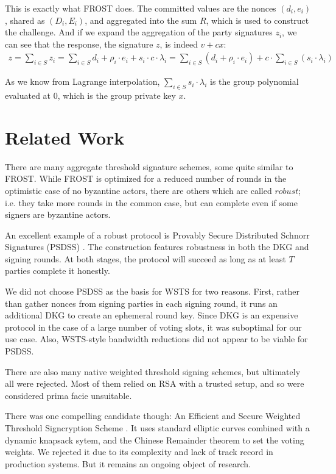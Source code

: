 \documentclass{article}
\theoremstyle{definition}
\theoremstyle{remark}
\begin{document}
This is exactly what FROST does.  The committed values are the nonces $(d_i, e_i)$, shared as $(D_i, E_i)$, and aggregated into the sum $R$, which is used to construct the challenge.  And if we expand the aggregation of the party signatures $z_i$, we can see that the response, the signature $z$, is indeed $v + cx$:
\begin{align}
  z = \sum_{i \in S}^{} z_i = \sum_{i \in S}^{} d_i + \rho_i \cdot e_i + s_i \cdot c \cdot \lambda_i = \sum_{i \in S}^{} (d_i + \rho_i \cdot e_i) + c \cdot \sum_{i \in S}^{}(s_i \cdot \lambda_i)\nonumber
\end{align}

As we know from Lagrange interpolation, $\sum_{i \in S}^{} s_i \cdot \lambda_i$ is the group polynomial evaluated at $0$, which is the group private key $x$.

\newpage
\onecolumn
\section{
  Related Work
}

There are many aggregate threshold signature schemes, some quite similar to FROST.  While FROST is optimized for a reduced number of rounds in the optimistic case of no byzantine actors, there are others which are called $robust$; i.e. they take more rounds in the common case, but can complete even if some signers are byzantine actors.

An excellent example of a robust protocol is Provably Secure Distributed Schnorr Signatures (PSDSS) \cite{psdss}.  The construction features robustness in both the DKG and signing rounds.  At both stages, the protocol will succeed as long as at least $T$ parties complete it honestly.

We did not choose PSDSS as the basis for WSTS for two reasons.  First, rather than gather nonces from signing parties in each signing round, it runs an additional DKG to create an ephemeral round key.  Since DKG is an expensive protocol in the case of a large number of voting slots, it was suboptimal for our use case.  Also, WSTS-style bandwidth reductions did not appear to be viable for PSDSS.

There are also many native weighted threshold signing schemes, but ultimately all were rejected.  Most of them relied on RSA with a trusted setup, and so were considered prima facie unsuitable.

There was one compelling candidate though: An Efficient and Secure Weighted Threshold Signcryption Scheme \cite{eswtss}.  It uses standard elliptic curves combined with a dynamic knapsack sytem, and the Chinese Remainder theorem to set the voting weights.  We rejected it due to its complexity and lack of track record in production systems.  But it remains an ongoing object of research.
\end{document}
